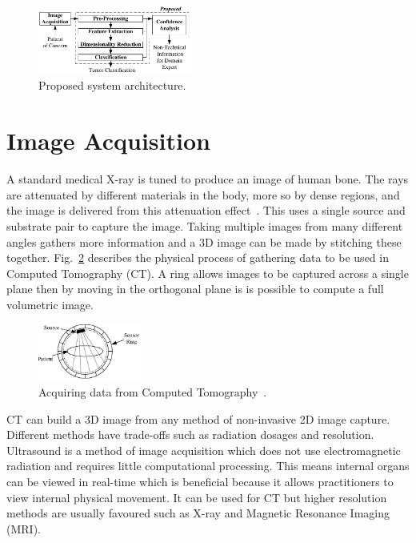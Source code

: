 \documentclass[journal]{IEEEtran}
\begin{document}
\begin{figure}[!htb]
   \centering
   \includegraphics[width = 0.45\textwidth]{Figures/Proposed.pdf}
   \caption{Proposed system architecture.}
   \label{fig:Proposed}
\end{figure}











\section{Image Acquisition}
\label{sec:image}

A standard medical X-ray is tuned to produce an image of human bone.
The rays are attenuated by different materials in the body, more so by dense regions, and the image is delivered from this attenuation effect~\cite{kayvan2006biomedical}. 
This uses a single source and substrate pair to capture the image.
Taking multiple images from many different angles gathers more information and a 3D image can be made by stitching these together.
Fig.~\ref{fig:ct} describes the physical process of gathering data to be used in Computed Tomography (CT).
A ring allows images to be captured across a single plane then by moving in the orthogonal plane is is possible to compute a full volumetric image. 

\begin{figure}[!htb]
   \centering
   \includegraphics[width = 0.3\textwidth]{Figures/CT.pdf}
   \caption{Acquiring data from Computed Tomography~\cite{kayvan2006biomedical}.}
   \label{fig:ct}
\end{figure}

CT can build a 3D image from any method of non-invasive 2D image capture.
Different methods have trade-offs such as radiation dosages and resolution.
Ultrasound is a method of image acquisition which does not use electromagnetic radiation and requires little computational processing. 
This means internal organs can be viewed in real-time which is beneficial because it allows practitioners to view internal physical movement. 
It can be used for CT but higher resolution methods are usually favoured such as X-ray and Magnetic Resonance Imaging (MRI).
\end{document}
